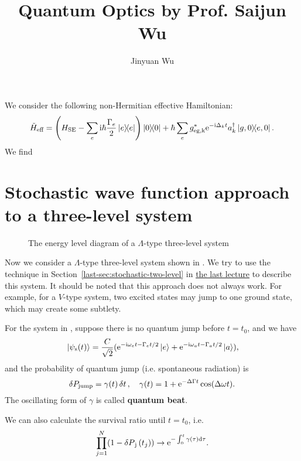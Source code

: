 \documentclass[hyperref, a4paper]{article}
\title{Quantum Optics by Prof. Saijun Wu}
\author{Jinyuan Wu}
\newcommand*{\ii}{\mathrm{i}}
\newcommand*{\ee}{\mathrm{e}}
\newcommand*{\concept}[1]{{\textbf{#1}}}
\newcommand{\lastnote}{\href{12-2.pdf}{the last lecture}}
\begin{document}
\maketitle

We consider the following non-Hermitian effective Hamiltonian:
\begin{equation}
    \tilde{H}_\text{eff} = \left( H_\text{SE} - \sum_e \ii \hbar \frac{\Gamma_e}{2} \dyad{e}  \right) \dyad{0}
    + \hbar \sum_{e} g^*_\text{eg,k} \ee^{- \ii \Delta_k t} a_k^\dagger \dyad{g, 0}{e, 0} .
\end{equation}
We find 

\section{Stochastic wave function approach to a three-level system}

\begin{figure}
    \centering
    
    \caption{The energy level diagram of a $\Lambda$-type three-level system}
    \label{fig:lambda-system}
\end{figure}

Now we consider a $\Lambda$-type three-level system shown in .
We try to use the technique in Section~\ref{last-sec:stochastic-two-level} in \lastnote{} to describe 
this system. It should be noted that this approach does not always work. For example, for a $V$-type 
system, two excited states may jump to one ground state, which may create some subtlety. %

For the system in , suppose there is no quantum jump before $t = t_0$, and we have 
\begin{equation}
    \ket*{\psi_\text{s}(t)} = \frac{C}{\sqrt{2}} (\ee^{-\ii \omega_e t - \Gamma_e t / 2} \ket*{e} + \ee^{- \ii \omega_a t - \Gamma_a t/ 2} \ket*{a}), 
\end{equation}
and the probability of quantum jump (i.e. spontaneous radiation) is 
\begin{equation}
    \var{P_\text{jump}} = \gamma(t) \var{t}, \quad \gamma(t) = 1 + \ee^{- \Delta \Gamma t} \cos(\Delta \omega t).
\end{equation}
The oscillating form of $\gamma$ is called \concept{quantum beat}.

We can also calculate the survival ratio until $t=t_0$, i.e. 
\begin{equation}
    \prod_{j=1}^N (1 - \var{P}_\text{j}(t_j)) \to \ee^{- \int_0^t \gamma(\tau) \dd{\tau}}.
\end{equation}
\end{document}
